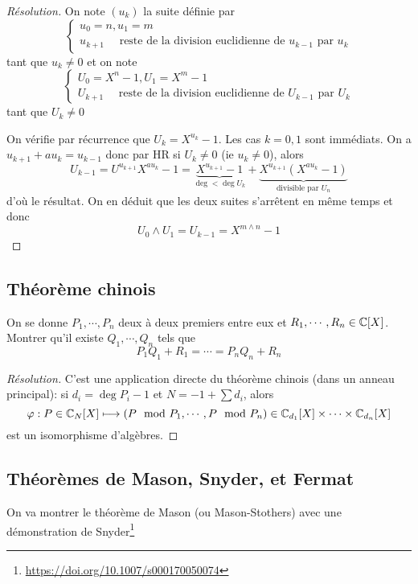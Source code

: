 \begin{proof}[Résolution]
    On note $(u_k)$ la suite définie par \[
        \begin{cases}
            u_0=n, u_1=m \\ u_{k+1} \quad \text{ reste de la division euclidienne de $u_{k-1}$ par $u_k$}
        \end{cases}
    \]
    tant que $u_k\neq 0$ et on note \[
        \begin{cases}
            U_0=X^n-1, U_1=X^m-1\\ U_{k+1}\quad \text{ reste de la division euclidienne de $U_{k-1}$ par $U_k$}
        \end{cases}
    \]
    tant que $U_k\neq 0$

    On vérifie par récurrence que $U_k=X^{u_k}-1$. Les cas $k=0, 1$ sont immédiats. On a $u_{k+1}+au_k=u_{k-1}$ donc par HR si $U_k\neq 0$ (ie $u_k\neq 0$), alors \[
        U_{k-1}=U^{u_{k+1}}X^{au_k}-1=\underbrace{X^{u_{k+1}}-1}_{\deg < \deg U_k}+\underbrace{X^{u_{k+1}}\left(X^{au_k}-1\right)}_{\text{divisible par } U_n}
    \]
    d'où le résultat. On en déduit que les deux suites s'arrêtent en même temps et donc \[
        U_0\land U_1=U_{k-1}=X^{m\land n}-1
    \]
\end{proof}

\subsection{Théorème chinois}


\begin{exo}
On se donne $P_1, \cdots, P_n$ deux à deux premiers entre eux et $R_1, \cdots, R_n\in\mathbb C[X]$. Montrer qu'il existe $Q_1, \cdots, Q_n$ tels que \[
    P_1Q_1+R_1=\cdots=P_nQ_n+R_n
\]
\end{exo}

\begin{proof}[Résolution]
    C'est une application directe du théorème chinois (dans un anneau principal): si $d_i=\deg P_i-1$ et $N=-1+\sum d_i$, alors \[
        \varphi: P\in \mathbb C_N[X]\longmapsto (P\mod P_1, \cdots, P\mod P_n)\in\mathbb C_{d_1}[X]\times \cdots \times \mathbb C_{d_n}[X]
    \]
    est un isomorphisme d'algèbres.
\end{proof}

\subsection{Théorèmes de Mason, Snyder, et Fermat}
On va montrer le théorème de Mason (ou Mason-Stothers) avec une démonstration de
Snyder\footnote{\url{https://doi.org/10.1007/s000170050074}}

